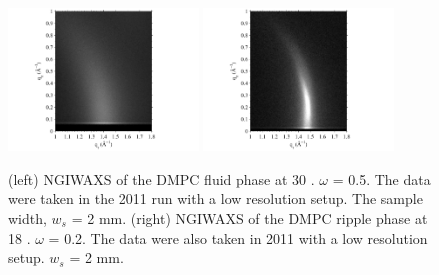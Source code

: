 \begin{figure}[htbp]
  \centering
  \includegraphics[trim=50 0 50 0,clip,width=0.45\textwidth]{figures/ripple/NGIWAXS/fluid_036}
  \includegraphics[trim=50 0 50 0,clip,width=0.45\textwidth]{figures/ripple/NGIWAXS/ripple_060}
  \caption{(left) NGIWAXS of the DMPC fluid phase at 30 \textcelsius. $\omega$ =
  0.5\textdegree. The data were taken in the 2011 run with a low resolution 
  setup. The sample width, $w_s$ = 2 mm. 
  (right) NGIWAXS of the DMPC ripple phase at 18 \textcelsius.
  $\omega$ = 0.2\textdegree. The data were also taken in 2011 with a low 
  resolution setup. $w_s$ = 2 mm.}
  \label{fig:fluid_vs_ripple}
\end{figure}

